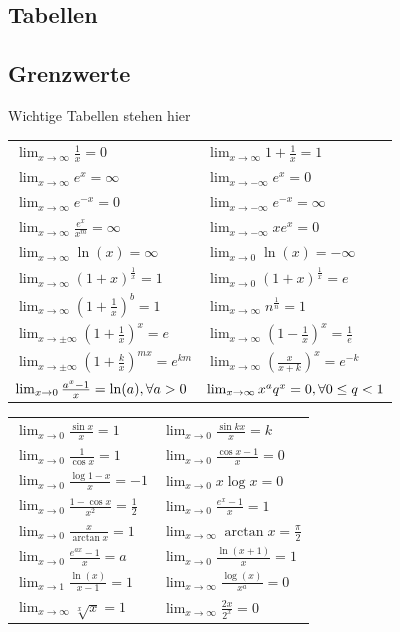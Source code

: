 \documentclass[8pt]{article}
\def\limxo{\lim_{x\to 0}}
\def\limxi{\lim_{x\to\infty}}
\def\limxn{\lim_{x\to-\infty}}
\begin{document}
\begin{multicols*}{3}
\section{Tabellen}
\subsection{Grenzwerte}
Wichtige Tabellen stehen hier
\begin{center}
  \begin{tabularx}{\linewidth}{XX}

    $\limxi \frac{1}{x} = 0$ & $\limxi 1 + \frac{1}{x} = 1$ \\
    $\limxi e^x = \infty$ & $\limxn e^x = 0$ \\
    $\limxi e^{-x} = 0$ & $\limxn e^{-x} = \infty$ \\
    $\limxi \frac{e^x}{x^m} = \infty$ & $\limxn xe^x = 0$ \\
    $\limxi \ln(x) = \infty$ & $\limxo \ln(x) = -\infty$ \\
    $\limxi (1+x)^{\frac{1}{x}} = 1$ & $\limxo (1+x)^{\frac{1}{x}} = e$ \\
    $\limxi (1+\frac{1}{x})^b = 1$ & $\limxi n^{\frac{1}{n}} = 1$ \\
    $\lim_{x\to\pm\infty} (1 + \frac{1}{x})^x = e$ & $\limxi (1-\frac{1}{x})^x = \frac{1}{e}$ \\
    $\lim_{x\to\pm\infty} (1 + \frac{k}{x})^{mx} = e^{km}$ & $\limxi (\frac{x}{x+k})^x = e^{-k}$ \\
    $\limxo \frac{a^x -1}{x} = \ln(a), \newline \forall a > 0$ &
    $\limxi x^a q^x = 0, \newline \forall 0 \le q < 1$ \\
  \end{tabularx}
  \begin{tabularx}{\linewidth}{XX}
    $\limxo \frac{\sin x}{x} = 1$ & $\limxo \frac{\sin kx}{x} = k$\\
    $\limxo \frac{1}{\cos x} = 1$ & $\limxo \frac{\cos x -1}{x} = 0$ \\
    $\limxo \frac{\log 1 - x}{x} = -1$ & $\limxo x \log x = 0$\\
    $\limxo \frac{1 - \cos x}{x^2} = \frac{1}{2}$ & $\limxo \frac{e^x-1}{x} = 1$ \\
    $\limxo \frac{x}{\arctan x} = 1$ & $\limxi \arctan x = \frac{\pi}{2}$ \\
    $\limxo \frac{e^{ax}-1}{x} = a$ & $\limxo \frac{\ln(x+1)}{x} = 1$ \\
    $\lim_{x\to 1} \frac{\ln(x)}{x-1} = 1$ & $\limxi \frac{\log(x)}{x^a} = 0$ \\
    $\limxi \sqrt[x]{x} = 1$ & $\limxi \frac{2x}{2^x} = 0$ \\
  \end{tabularx}
\end{center}


\end{multicols*}
\end{document}
